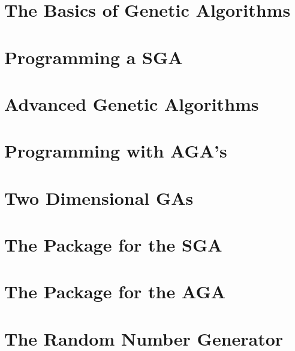 \chapter{The Basics of Genetic Algorithms}

\chapter{Programming a SGA}

\chapter{Advanced Genetic Algorithms}

\chapter{Programming with AGA's}

\chapter{Two Dimensional GAs}

\begin{appendix}
\chapter{The Package for the SGA}

\chapter{The Package for the AGA}

\chapter{The Random Number Generator}


\end{appendix}

